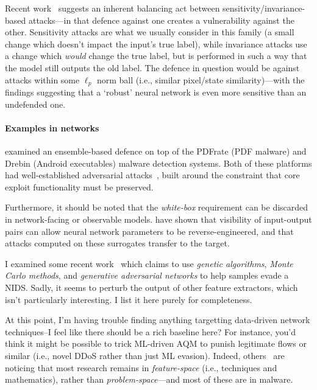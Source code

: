 \documentclass[11pt,a4paper]{article}
\begin{document}
Recent work~\parencite{DBLP:journals/corr/abs-2002-04599} suggests an inherent balancing act between sensitivity/invariance-based attacks---in that defence against one creates a vulnerability against the other.
Sensitivity attacks are what we usually consider in this family (a small change which doesn't impact the input's true label), while invariance attacks use a change which \emph{would} change the true label, but is performed in such a way that the model still outputs the old label.
The defence in question would be against attacks within some $\ell_p$ norm ball (i.e., similar pixel/state similarity)---with the findings suggesting that a `robust' neural network is even more sensitive than an undefended one.

\paragraph{Examples in networks}
\Textcite{DBLP:conf/ndss/SmutzS16} examined an ensemble-based defence on top of the PDFrate (PDF malware) and Drebin (Android executables) malware detection systems.
Both of these platforms had well-established adversarial attacks~\parencite{DBLP:conf/ccs/MaiorcaCG13,DBLP:conf/sp/SrndicL14}, built around the constraint that core exploit functionality must be preserved.

Furthermore, it should be noted that the \emph{white-box} requirement can be discarded in network-facing or observable models.
\textcite{DBLP:conf/uss/TramerZJRR16,DBLP:conf/uss/JagielskiCBKP20} have shown that visibility of input-output pairs can allow neural network parameters to be reverse-engineered, and that attacks computed on these surrogates transfer to the target.

I examined some recent work~\parencite{DBLP:journals/corr/abs-2004-11898} which claims to use \emph{genetic algorithms}, \emph{Monte Carlo methods}, and \emph{generative adversarial networks} to help samples evade a NIDS.
Sadly, it seems to perturb the output of other feature extractors, which isn't particularly interesting.
I list it here purely for completeness.

At this point, I'm having trouble finding anything targetting data-driven network techniques--I feel like there should be a rich baseline here?
For instance, you'd think it might be possible to trick ML-driven AQM to punish legitimate flows or similar (i.e., novel DDoS rather than just ML evasion).
Indeed, others~\parencite{DBLP:conf/sp/PierazziPCC20} are noticing that most research remains in \emph{feature-space} (i.e., techniques and mathematics), rather than \emph{problem-space}---and most of these are in malware.

\printbibliography[title={References}]
\end{document}
